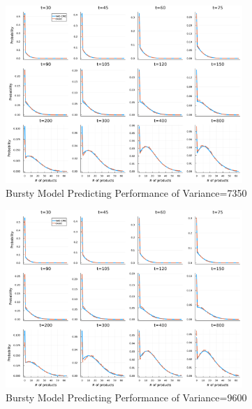 \documentclass[a4paper,10pt]{article}
\begin{document}
\begin{figure}[h]
	\centering
	\includegraphics[width=0.8\textwidth]{Figs/predict_var=7350.pdf}
	\caption{Bursty Model Predicting Performance of Variance=7350}\label{Bursty_predicting_var=7350}  
\end{figure}
\begin{figure}[h]
	\centering
	\includegraphics[width=0.8\textwidth]{Figs/predict_var=9600.pdf}
	\caption{Bursty Model Predicting Performance of Variance=9600}\label{Bursty_predicting_var=9600}  
\end{figure}
\clearpage
\newpage
\end{document}
